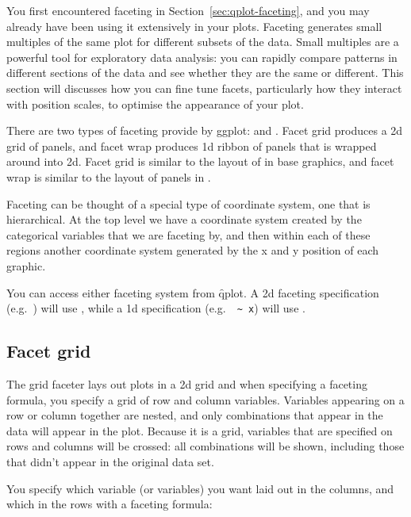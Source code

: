 You first encountered faceting in Section~\ref{sec:qplot-faceting}, and you may already have been using it extensively in your plots.  Faceting generates small multiples of the same plot for different subsets of the data.  Small multiples are a powerful tool for exploratory data analysis: you can rapidly compare patterns in different sections of the data and see whether they are the same or different.  This section will discusses how you can fine tune facets, particularly how they interact with position scales, to optimise the appearance of your plot. 

There are two types of faceting provide by ggplot:  and .  Facet grid produces a 2d grid of panels, and facet wrap produces 1d ribbon of panels that is wrapped around into 2d.  Facet grid is similar to the layout of  in base graphics, and facet wrap is similar to the layout of panels in .

Faceting can be thought of a special type of coordinate system, one that is hierarchical.  At the top level we have a coordinate system created by the categorical variables that we are faceting by, and then within each of these regions another coordinate system generated by the x and y position of each graphic.

You can access either faceting system from \f{qplot}. A 2d faceting specification (e.g.\ ) will use , while a 1d specification (e.g.\ \verb| ~ x|) will use .

\subsection{Facet grid}

The grid faceter lays out plots in a 2d grid and when specifying a faceting formula, you specify a grid of row and column variables. Variables appearing on a row or column together are nested, and only combinations that appear in the data will appear in the plot. Because it is a grid, variables that are specified on rows and columns will be crossed: all combinations will be shown, including those that didn't appear in the original data set.

You specify which variable (or variables) you want laid out in the columns, and which in the rows with a faceting formula:

